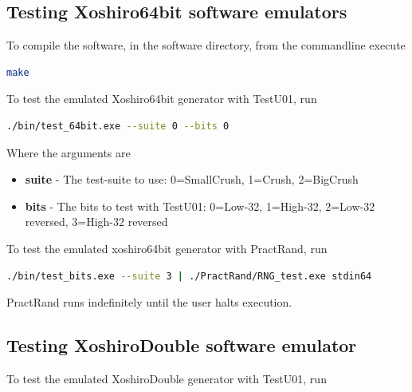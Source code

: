 \documentclass{article}
\begin{document}
\subsection{Testing Xoshiro64bit software emulators}

To compile the software, in the software directory, from the commandline execute

\begin{minipage}{1.0\textwidth}
\centering
\begin{lstlisting}[language=bash , label=lst:Make]
make
\end{lstlisting}
\end{minipage}

To test the emulated Xoshiro64bit generator with TestU01, run

\begin{minipage}{1.0\textwidth}
\centering
\begin{lstlisting}[language=bash, label=lst:SwTestU01]
./bin/test_64bit.exe --suite 0 --bits 0 
\end{lstlisting}
\end{minipage}

Where the arguments are

\begin{itemize}
\item \textbf{suite} - The test-suite to use: 0=SmallCrush, 1=Crush, 2=BigCrush 
\item \textbf{bits} - The bits to test with TestU01: 0=Low-32, 1=High-32, 2=Low-32 reversed, 3=High-32 reversed
\end{itemize}

To test the emulated xoshiro64bit generator with PractRand, run

\begin{minipage}{1.0\textwidth}
\centering
\begin{lstlisting}[language=bash, label=lst:SwPractRand]
./bin/test_bits.exe --suite 3 | ./PractRand/RNG_test.exe stdin64 
\end{lstlisting}
\end{minipage}

PractRand runs indefinitely until the user halts execution.

\subsection{Testing XoshiroDouble software emulator}

To test the emulated XoshiroDouble generator with TestU01, run
\end{document}
